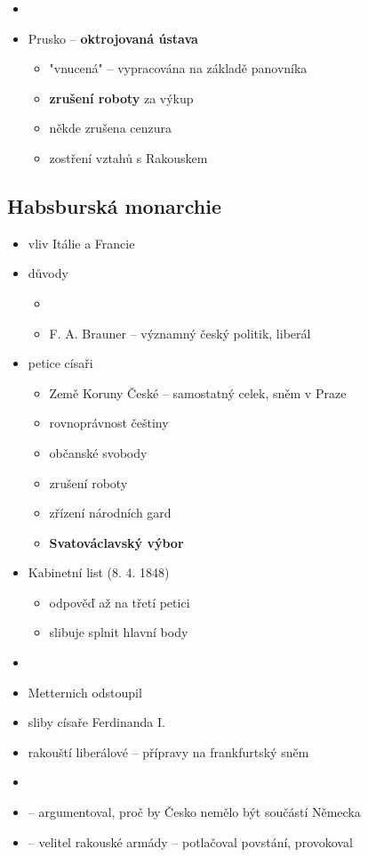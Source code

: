 \begin{itemize}
\begin{itemize}
	\item {}
	\item Prusko -- \textbf{oktrojovaná ústava}
		\begin{itemize}
		\item "vnucená" -- vypracována na základě panovníka
		\item \textbf{zrušení roboty} za výkup
		\item někde zrušena cenzura
		\item zostření vztahů s Rakouskem
		\end{itemize}
	\end{itemize}
\end{itemize}

\subsection{Habsburská monarchie}
\begin{itemize}
\item vliv Itálie a Francie
\item důvody
	\begin{itemize}
	\item {}
	\item F. A. Brauner -- významný český politik, liberál
	\end{itemize}
\item petice císaři
	\begin{itemize}
	\item Země Koruny České -- samostatný celek, sněm v Praze
	\item rovnoprávnost češtiny
	\item občanské svobody
	\item zrušení roboty
	\item zřízení národních gard
	\item \textbf{Svatováclavský výbor}
	\end{itemize}
\item Kabinetní list (8. 4. 1848)
	\begin{itemize}
	\item odpověď až na třetí petici
	\item slibuje splnit hlavní body
	\end{itemize}
\item {}
\item Metternich odstoupil
\item sliby císaře Ferdinanda I.
\item rakouští liberálové -- přípravy na frankfurtský sněm
\item {}
\item {} -- argumentoval, proč by Česko nemělo být součástí Německa
\item {} -- velitel rakouské armády -- potlačoval povstání, provokoval
\end{itemize}

